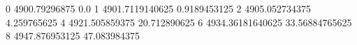 0 4900.79296875 0.0
1 4901.7119140625 0.9189453125
2 4905.052734375 4.259765625
4 4921.505859375 20.712890625
6 4934.36181640625 33.56884765625
8 4947.876953125 47.083984375
